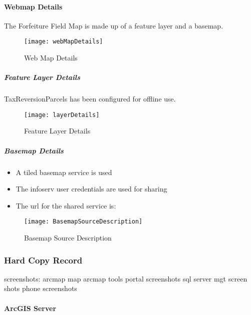   \paragraph{Webmap Details}The Forfeiture Field Map is made up of a feature layer and a basemap.
  \begin{figure}[h!]
  \centering
      \texttt{[image: webMapDetails]}
  \vspace{-.25in}

  \caption{Web Map Details}
  \end{figure}
  \subparagraph{Feature Layer Details}TaxReversionParcels has been configured for offline use.
  \begin{figure}[h!]
  \centering
      \texttt{[image: layerDetails]}
  \vspace{-.15in}

  \caption{Feature Layer Details}
  \end{figure}
  \clearpage
  \subparagraph{Basemap Details}
  \begin{itemize}
    \setlength\itemsep{.3in}
    \item A tiled basemap service is used
    \item The infoserv user credentials are used for sharing
    \item The url for the shared service is:
  \end{itemize}

 \noindent \textcolor{HyperlinkBlue1}{\scriptsize{}}
 \vspace{.5in}

  \begin{figure}[h!]
  \centering
  \texttt{[image: BasemapSourceDescription]}
  \caption{Basemap Source Description}
  \end{figure}
  \clearpage
  \subsubsection{Hard Copy Record}
  screenshots:
  arcmap map
  arcmap tools
  portal screenshots
  sql server mgt screen shots
  phone screenshots
  \paragraph{ArcGIS Server}
  \clearpage
